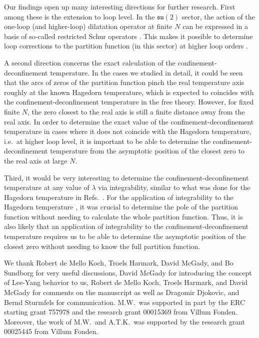 \documentclass[a4paper,11pt]{article}
\begin{document}
Our findings open up many interesting directions for further research.
First among these is the extension to loop level.
In the $\mathfrak{su}(2)$ sector, the action of the one-loop (and higher-loop) dilatation operator at finite $N$ can be expressed in a basis of so-called restricted Schur operators \cite{Bhattacharyya:2008xy,DeComarmond:2010ie,deMelloKoch:2012sv}. This makes it possible to determine loop corrections to the partition function (in this sector) at higher loop orders \cite{KWinprogress}.

A second direction concerns the exact calculation of the confinement-deconfinement temperature.
In the cases we studied in detail, it could be seen that the arcs of zeros of the partition function pinch the real temperature axis roughly at the known Hagedorn temperature, which is expected \cite{Aharony:2003sx} to coincides with the confinement-deconfinement temperature in the free theory. However, for fixed finite $N$, the zero closest to the real axis is still a finite distance away from the real axis.
In order to determine the exact value of the confinement-deconfinement temperature in cases where it does not coincide with the Hagedorn temperature, i.e.\ at higher loop level, it is important to be able to determine the confinement-deconfinement temperature from the asymptotic position of the closest zero to the real axis at large $N$.

Third, it would be very interesting to determine the confinement-deconfinement temperature at any value of $\lambda$ via integrability, similar to what was done for the Hagedorn temperature in Refs.\ \cite{Harmark:2017yrv,Harmark:2018red}.
For the application of integrability to the Hagedorn temperature \cite{Harmark:2017yrv,Harmark:2018red}, it was crucial to determine the pole of the partition function without needing to calculate the whole partition function. Thus, it is also likely that an application of integrability to the confinement-deconfinement temperature requires us to be able to determine the asymptotic position of the closest zero without needing to know the full partition function.


\begin{acknowledgments}
% 
We thank 
 Robert de Mello Koch,
 Troels Harmark,
 David McGady,
 and Bo Sundborg
for very useful discussions,
David McGady for introducing the concept of Lee-Yang behavior to us,
Robert de Mello Koch,
 Troels Harmark,
 and David McGady
 for comments on the manuscript
as well as 
 Dragomir Djokovic,
and Bernd Sturmfels
for communication.
% 
M.W.\ was supported in part by the ERC starting grant 757978 and the research grant 00015369 from Villum Fonden.
Moreover, the work of M.W.\ and A.T.K.\ was supported by the research grant 00025445 from Villum Fonden.

\end{acknowledgments}
\end{document}
